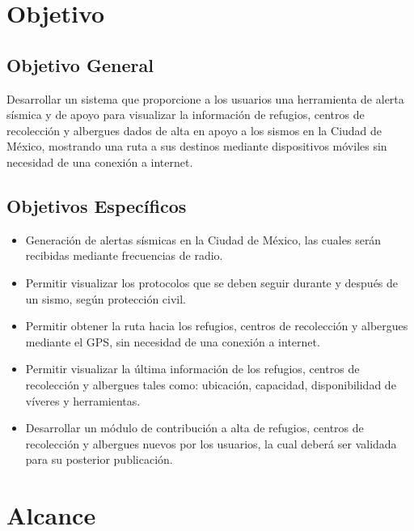\section{Objetivo}

\subsection{Objetivo General}
Desarrollar un sistema que proporcione a los usuarios una herramienta de alerta sísmica y de apoyo para visualizar la información de refugios, centros de recolección y albergues dados de alta en apoyo a los sismos en la Ciudad de México, mostrando una ruta a sus destinos mediante dispositivos móviles sin necesidad de una conexión a internet.

\subsection{Objetivos Específicos}
\begin{itemize}
	\item Generación de alertas sísmicas en la Ciudad de México, las cuales serán recibidas mediante frecuencias de radio.
	\item Permitir visualizar los protocolos que se deben seguir durante y después de un sismo, según protección civil.
	\item Permitir obtener la ruta hacia los refugios, centros de recolección y albergues mediante el GPS, sin necesidad de una conexión a internet.
	\item Permitir visualizar la última información de los refugios, centros de recolección y albergues tales como: ubicación, capacidad, disponibilidad de víveres y herramientas.
	\item Desarrollar un módulo de contribución a alta de refugios, centros de recolección y albergues nuevos por los usuarios, la cual deberá ser validada para su posterior publicación.
\end{itemize}


\section{Alcance}

